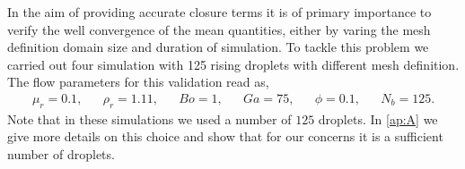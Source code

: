

In the aim of providing accurate closure terms it is of primary importance to verify the well convergence of the mean quantities, either by varing the mesh definition domain size and duration of simulation.
To tackle this problem we carried out four simulation with 125 rising droplets with different mesh definition. 
The flow parameters for this validation read as,  
\begin{align*}
    \mu_r = 0.1,
    && \rho_r = 1.11,
    && Bo = 1,
    && Ga = 75,
    && \phi = 0.1,
    && N_b =125. 
\end{align*}
Note that in these simulations we used a number of $125$ droplets.  
In \ref{ap:A} we give more details on this choice and show that for our concerns it is a sufficient number of droplets. 

